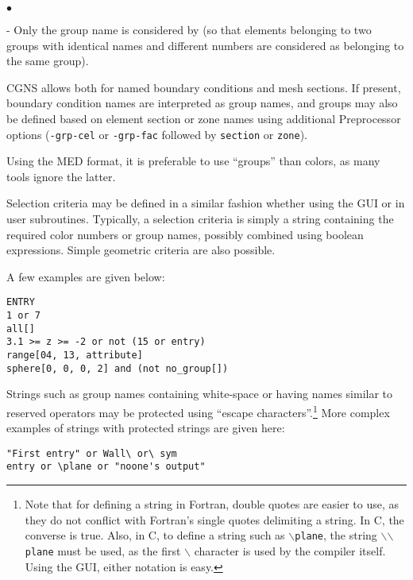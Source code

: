 {{{\begin{list}{$\bullet$}{}
\begin{list}{-}{}
            Only the group name is considered by \CS (so that elements
            belonging to two groups with identical names and different
            numbers are considered as belonging to the same group).
      \item CGNS allows both for named boundary conditions and mesh
            sections. If present, boundary condition names are
            interpreted as group names, and groups may also be defined
            based on element section or zone names using additional
            Preprocessor options (\texttt{-grp-cel} or
            \texttt{-grp-fac} followed by \texttt{section} or
            \texttt{zone}).
      \item Using the MED format, it is preferable to use ``groups''
            than colors, as many tools ignore the latter.
      \end{list}
\end{list}

Selection criteria may be defined in a similar fashion whether
using the GUI or in user subroutines.
Typically, a selection criteria is simply a string containing
the required color numbers or group names, possibly combined
using boolean expressions. Simple geometric criteria are also
possible.

A few examples are given below:

\verb+ENTRY+\\
\verb+1 or 7+\\
\verb+all[]+\\
\verb+3.1 >= z >= -2 or not (15 or entry)+\\
\verb+range[04, 13, attribute]+\\
\verb+sphere[0, 0, 0, 2] and (not no_group[])+

Strings such as group names containing white-space
or having names similar to reserved operators may be protected
using ``escape characters''.\footnote{Note that for defining a
string in Fortran, double quotes are easier to use, as they do not
conflict with Fortran's single quotes delimiting a string.
In C, the converse is true. Also, in C, to define a string
such as \texttt{{$\backslash$}plane}, the string
\texttt{{$\backslash$}{$\backslash$}plane} must be
used, as the first $\backslash$ character is used by the
compiler itself. Using the GUI, either notation is easy.}
More complex examples of strings with protected strings are given here:

\verb+"First entry" or Wall\ or\ sym+\\
\verb+entry or \plane or "noone's output"+

}}}
